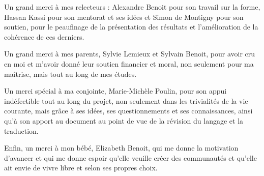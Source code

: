 Un grand merci à mes relecteurs :  Alexandre Benoit pour son travail sur la forme, Hassan Kassi pour son mentorat et ses idées et Simon de Montigny pour son soutien, pour le peaufinage de la présentation des résultats et l'amélioration de la cohérence de ces derniers.

Un grand merci à mes parents, Sylvie Lemieux et Sylvain Benoit, pour avoir cru en moi et m'avoir donné leur soutien financier et moral, non seulement pour ma maîtrise, mais tout au long de mes études.

Un merci spécial à ma conjointe, Marie-Michèle Poulin, pour son appui indéfectible tout au long du projet, non seulement dans les trivialités de la vie courante, mais grâce à ses idées, ses questionnements et ses connaissances, ainsi qu'à son apport au document au point de vue de la révision du langage et la traduction. 

Enfin, un merci à mon bébé, Elizabeth Benoit, qui me donne la motivation d'avancer et qui me donne espoir qu'elle veuille créer des communautés et qu'elle ait envie de vivre libre et selon ses propres choix.


























